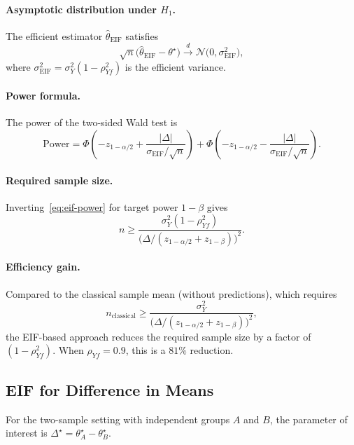 \paragraph{Asymptotic distribution under $H_1$.}
The efficient estimator $\widehat{\theta}_{\text{EIF}}$ satisfies
\[
\sqrt{n}\big(\widehat{\theta}_{\text{EIF}} - \theta^\star\big) \xrightarrow{d} \mathcal{N}\big(0, \sigma_{\text{EIF}}^2\big),
\]
where $\sigma_{\text{EIF}}^2 = \sigma_Y^2(1 - \rho_{Yf}^2)$ is the efficient variance.

\paragraph{Power formula.}
The power of the two-sided Wald test is
\begin{equation}\label{eq:eif-power}
\text{Power} = \Phi\left(-z_{1-\alpha/2} + \frac{|\Delta|}{\sigma_{\text{EIF}}/\sqrt{n}}\right)
+ \Phi\left(-z_{1-\alpha/2} - \frac{|\Delta|}{\sigma_{\text{EIF}}/\sqrt{n}}\right).
\end{equation}

\paragraph{Required sample size.}
Inverting~\eqref{eq:eif-power} for target power $1 - \beta$ gives
\begin{equation}\label{eq:eif-n-required}
n \ge \frac{\sigma_Y^2(1 - \rho_{Yf}^2)}{\big(\Delta / (z_{1-\alpha/2} + z_{1-\beta})\big)^2}.
\end{equation}

\paragraph{Efficiency gain.}
Compared to the classical sample mean (without predictions), which requires
\[
n_{\text{classical}} \ge \frac{\sigma_Y^2}{\big(\Delta / (z_{1-\alpha/2} + z_{1-\beta})\big)^2},
\]
the EIF-based approach reduces the required sample size by a factor of $(1 - \rho_{Yf}^2)$.
When $\rho_{Yf} = 0.9$, this is a $81\%$ reduction.

\subsection{EIF for Difference in Means}

For the two-sample setting with independent groups $A$ and $B$, the parameter of interest is
$\Delta^\star = \theta_A^\star - \theta_B^\star$.

